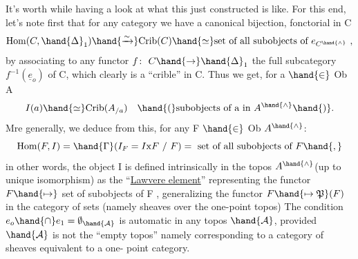It's worth while having a look at what this  just constructed is
like.  For this end,  let's note first that for any category \hand{,} we have
a canonical bijection,  fonctorial in C
\[ \mathrm{Hom}(C, \hand{\Delta}_1) \hand{\xrightarrow{\sim}} \mathrm{Crib}(C) \hand{\simeq} \text{set of all subobjects of } e_{C^{\hand{\wedge}}} \ , \]
by associating to any functor $f\colon\ C \hand{\to} \hand{\Delta}_1$  the full subcategory $f^{-1}(\underline{e}_o)$ of
C,  which clearly is a ``crible''\inserted{[=sieve]} in C.  Thus we get,  for a $\hand{\in}$ Ob A
\[ I(a) \hand{\simeq} \mathrm{Crib}(A_{/a}) \quad \hand{(}\text{subobjects of a in } A^{\hand{\wedge}}\hand{)}. \]
Mre generally,  we deduce from this,  for any F $\hand{\in}$ Ob $A^{\hand{\wedge}}$:
\[ \mathrm{Hom}(F,I) = \hand{\Gamma}(I_F = I\mathrm{x}F \ / \ F) = \text{ set of all subobjects of } F\hand{,} \]
in other words, the object I is defined intrinsically in the topos $A^{\hand{\wedge}}$\hand{/}(up
to unique isomorphism)  as the ``\uline{Lawvere element}''  representing the functor
$F \hand{\mapsto}$ set of subobjects of F ,  generalizing the functor  $F \hand{\mapsto \mathfrak{P}}(F)$ in the
category of sets (namely sheaves over the one-point topos)\hand{,}  The  condition
$e_o \hand{\cap} e_1 = \emptyset_{\hand{\mathcal{A}}}$  is automatic in any topos $\hand{\mathcal{A}}$, provided $\hand{\mathcal{A}}$ is not the ``empty
topos''  namely corresponding to a category of sheaves equivalent to a one-%
point category. 
